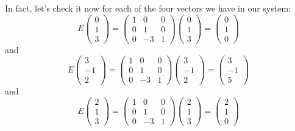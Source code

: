 \documentclass[10pt,]{book}
\theoremstyle{plain}
\theoremstyle{definition}
\numberwithin{equation}{section}
\begin{document}
        In fact, let's check it now for each of the four vectors we have in our system:
        \[
          E \begin{pmatrix} 0 \\ 1 \\ 3 \end{pmatrix} =
          \begin{pmatrix} 1 &0 &0 \\ 0 &1 &0 \\
          0 &-3 &1 \end{pmatrix} \begin{pmatrix} 0 \\ 1 \\ 3 \end{pmatrix}
          = \begin{pmatrix} 0 \\ 1 \\ 0 \end{pmatrix}
        \]
        and
        \[
          E \begin{pmatrix} 3 \\ -1 \\ 2 \end{pmatrix} =
          \begin{pmatrix} 1 &0 &0 \\ 0 &1 &0 \\ 0 &-3
          &1 \end{pmatrix} \begin{pmatrix} 3 \\ -1 \\ 2 \end{pmatrix} =
          \begin{pmatrix} 3 \\ -1 \\ 5 \end{pmatrix}
        \]
        and
        \[
          E \begin{pmatrix} 2 \\ 1 \\ 3 \end{pmatrix} =
          \begin{pmatrix} 1 &0 &0 \\ 0 &1 &0 \\
          0 &-3 &1 \end{pmatrix} \begin{pmatrix} 2 \\ 1 \\ 3
          \end{pmatrix} = \begin{pmatrix} 2 \\ 1 \\ 0 \end{pmatrix}
        \]
\end{document}
